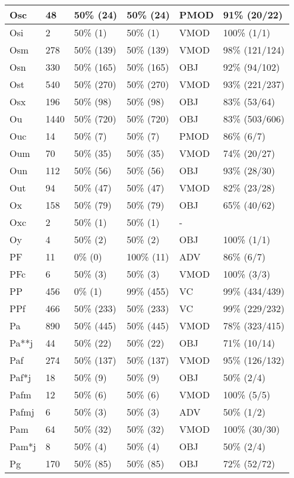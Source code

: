 \begin{figure*}
\begin{tabular}{|l|l|l|l||l|l|}
\hline
 Osc & 48 & 50\% (24) & 50\% (24) & PMOD & 91\% (20/22) \\ 
\hline
 Osi & 2 & 50\% (1) & 50\% (1) & VMOD & 100\% (1/1) \\ 
\hline
 Osm & 278 & 50\% (139) & 50\% (139) & VMOD & 98\% (121/124) \\ 
\hline
 Osn & 330 & 50\% (165) & 50\% (165) & OBJ & 92\% (94/102) \\ 
\hline
 Ost & 540 & 50\% (270) & 50\% (270) & VMOD & 93\% (221/237) \\ 
\hline
 Osx & 196 & 50\% (98) & 50\% (98) & OBJ & 83\% (53/64) \\ 
\hline
 Ou & 1440 & 50\% (720) & 50\% (720) & OBJ & 83\% (503/606) \\ 
\hline
 Ouc & 14 & 50\% (7) & 50\% (7) & PMOD & 86\% (6/7) \\ 
\hline
 Oum & 70 & 50\% (35) & 50\% (35) & VMOD & 74\% (20/27) \\ 
\hline
 Oun & 112 & 50\% (56) & 50\% (56) & OBJ & 93\% (28/30) \\ 
\hline
 Out & 94 & 50\% (47) & 50\% (47) & VMOD & 82\% (23/28) \\ 
\hline
 Ox & 158 & 50\% (79) & 50\% (79) & OBJ & 65\% (40/62) \\ 
\hline
 Oxc & 2 & 50\% (1) & 50\% (1) & - &  \\ 
\hline
 Oy & 4 & 50\% (2) & 50\% (2) & OBJ & 100\% (1/1) \\ 
\hline
 PF & 11 & 0\% (0) & 100\% (11) & ADV & 86\% (6/7) \\ 
\hline
 PFc & 6 & 50\% (3) & 50\% (3) & VMOD & 100\% (3/3) \\ 
\hline
 PP & 456 & 0\% (1) & 99\% (455) & VC & 99\% (434/439) \\ 
\hline
 PPf & 466 & 50\% (233) & 50\% (233) & VC & 99\% (229/232) \\ 
\hline
 Pa & 890 & 50\% (445) & 50\% (445) & VMOD & 78\% (323/415) \\ 
\hline
 Pa**j & 44 & 50\% (22) & 50\% (22) & OBJ & 71\% (10/14) \\ 
\hline
 Paf & 274 & 50\% (137) & 50\% (137) & VMOD & 95\% (126/132) \\ 
\hline
 Paf*j & 18 & 50\% (9) & 50\% (9) & OBJ & 50\% (2/4) \\ 
\hline
 Pafm & 12 & 50\% (6) & 50\% (6) & VMOD & 100\% (5/5) \\ 
\hline
 Pafmj & 6 & 50\% (3) & 50\% (3) & ADV & 50\% (1/2) \\ 
\hline
 Pam & 64 & 50\% (32) & 50\% (32) & VMOD & 100\% (30/30) \\ 
\hline
 Pam*j & 8 & 50\% (4) & 50\% (4) & OBJ & 50\% (2/4) \\ 
\hline
 Pg & 170 & 50\% (85) & 50\% (85) & OBJ & 72\% (52/72) \\ 
\hline
\end{tabular}
\end{figure*}
